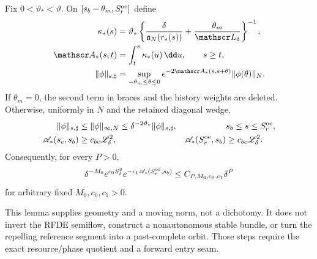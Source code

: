 \begin{lemma}
Fix \(0<\vartheta_*<\vartheta\).  On
\([s_b-\theta_m,S_r^{\rm oe}]\) define
\begin{align}
 \kappa_*(s)
 &=\vartheta_*
   \left\{
    \frac{\delta}{\mathfrak a_N(r_*(s))}
       +\frac{\theta_m}{\mathscr L_\delta}
   \right\}^{-1},\notag\\
 \mathscr A_*(s,t)
 &=\int_t^s\kappa_*(u)\,\dd u,
 \qquad s\ge t,                                 \label{eq:repelling-core-moving-action}\\
 \|\phi\|_{s,\sharp}
 &=\sup_{-\theta_m\le\theta\le0}
    e^{-2\mathscr A_*(s,s+\theta)}
       \|\phi(\theta)\|_N.                     \label{eq:repelling-core-moving-history-norm}
\end{align}
If \(\theta_m=0\), the second term in braces and the history weights are
deleted.  Otherwise, uniformly in \(N\) and the retained diagonal wedge,
\begin{align}
 \|\phi\|_{s,\sharp}
 &\le\|\phi\|_{\infty,N}
 \le\delta^{-2\vartheta_*}\|\phi\|_{s,\sharp},
 &&s_b\le s\le S_r^{\rm oe},                    \label{eq:repelling-core-history-norm-comparison}\\
 \mathscr A_*(s_c,s_b)
 &\ge c_{bc}\mathscr L_\delta^2,
 &\mathscr A_*(S_r^{\rm oe},s_b)&\ge c_{bc}\mathscr L_\delta^2.  \label{eq:repelling-core-action-lower-bound}
\end{align}
Consequently, for every \(P>0\),
\begin{equation}
 \delta^{-M_0}e^{c_0S_\delta^3}
 e^{-c_1\mathscr A_*(S_r^{\rm oe},s_b)}
 \le C_{P,M_0,c_0,c_1}\delta^P                 \label{eq:repelling-core-action-flat-envelope}
\end{equation}
for arbitrary fixed \(M_0,c_0,c_1>0\).

This lemma supplies geometry and a moving norm, not a dichotomy.  It does
not invert the RFDE semiflow, construct a nonautonomous stable bundle, or
turn the repelling reference segment into a past-complete orbit.  Those
steps require the exact resource/phase quotient and a forward entry seam.
\end{lemma}

